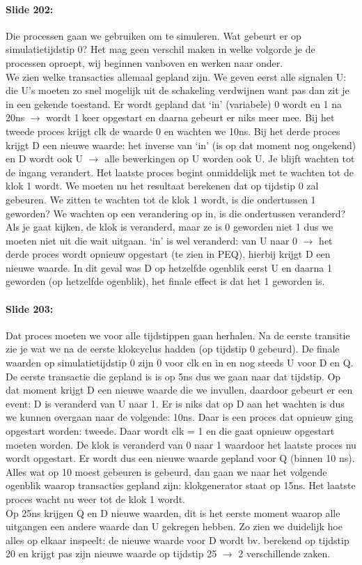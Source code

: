 \documentclass[10pt,a4paper]{book}
\begin{document}
\paragraph{Slide 202:} Die processen gaan we gebruiken om te simuleren. Wat gebeurt er op simulatietijdstip 0? Het mag geen verschil maken in welke volgorde je de processen oproept, wij beginnen vanboven en werken naar onder.\\
We zien welke transacties allemaal gepland zijn. We geven eerst alle signalen U: die U's moeten zo snel mogelijk uit de schakeling verdwijnen want pas dan zit je in een gekende toestand. Er wordt gepland dat `in' (variabele) 0 wordt en 1 na 20ns $\rightarrow$ wordt 1 keer opgestart en daarna gebeurt er niks meer mee. Bij het tweede proces krijgt clk de waarde 0 en wachten we 10ns. Bij het derde proces krijgt D een nieuwe waarde: het inverse van `in' (is op dat moment nog ongekend) en D wordt ook U $\rightarrow$ alle bewerkingen op U worden ook U. Je blijft wachten tot de ingang verandert. Het laatste proces begint onmiddelijk met te wachten tot de klok 1 wordt. We moeten nu het resultaat berekenen dat op tijdstip 0 zal gebeuren. We zitten te wachten tot de klok 1 wordt, is die ondertussen 1 geworden? We wachten op een verandering op in, is die ondertussen veranderd? Als je gaat kijken, de klok is veranderd, maar ze is 0 geworden niet 1 dus we moeten niet uit die wait uitgaan. `in' is wel veranderd: van U naar 0 $\rightarrow$ het derde proces wordt opnieuw opgestart (te zien in PEQ), hierbij krijgt D een nieuwe waarde. In dit geval was D op hetzelfde ogenblik eerst U en daarna 1 geworden (op hetzelfde ogenblik), het finale effect is dat het 1 geworden is.

\paragraph{Slide 203:} Dat proces moeten we voor alle tijdstippen gaan herhalen. Na de eerste transitie zie je wat we na de eerste klokcyclus hadden (op tijdstip 0 gebeurd). De finale waarden op simulatietijdstip 0 zijn 0 voor clk en in en nog steeds U voor D en Q. De eerste transactie die gepland is is op 5ns dus we gaan naar dat tijdstip. Op dat moment krijgt D een nieuwe waarde die we invullen, daardoor gebeurt er een event: D is veranderd van U naar 1. Er is niks dat op D aan het wachten is dus we kunnen overgaan naar de volgende: 10ns. Daar is een proces dat opnieuw ging opgestart worden: tweede. Daar wordt clk = 1 en die gaat opnieuw opgestart moeten worden. De klok is veranderd van 0 naar 1 waardoor het laatste proces nu wordt opgestart. Er wordt dus een nieuwe waarde gepland voor Q (binnen 10 ns). Alles wat op 10 moest gebeuren is gebeurd, dan gaan we naar het volgende ogenblik waarop transacties gepland zijn: klokgenerator staat op 15ns. Het laatste proces wacht nu weer tot de klok 1 wordt.\\
Op 25ns krijgen Q en D nieuwe waarden, dit is het eerste moment waarop alle uitgangen een andere waarde dan U gekregen hebben. Zo zien we duidelijk hoe alles op elkaar inspeelt: de nieuwe waarde voor D wordt bv. berekend op tijdstip 20 en krijgt pas zijn nieuwe waarde op tijdstip 25 $\rightarrow$ 2 verschillende zaken. 
\end{document}
